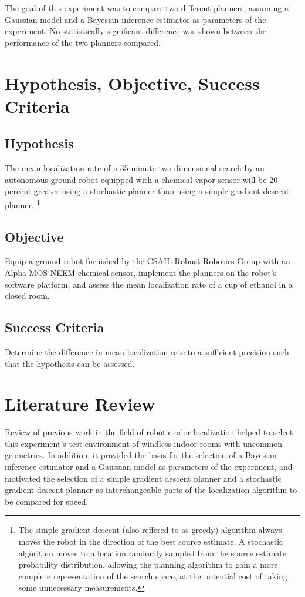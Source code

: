 \documentclass[submit, 12pt]{aiaa-pretty-modified}
\begin{document}
The goal of this experiment was to compare two different planners,
assuming a Gaussian model and a Bayesian inference estimator as
parameters of the experiment.  No statistically significant difference
was shown between the performance of the two planners compared.

\section{Hypothesis, Objective, Success Criteria}
\label{sec:hos}
\subsection*{Hypothesis} 
The mean localization rate of a 35-minute two-dimensional search by an
autonomous ground robot equipped with a chemical vapor sensor will be 20 percent
greater using a stochastic planner than using a simple gradient descent planner.
\footnote{ The simple gradient descent (also reffered to as greedy) algorithm always moves the robot in the
  direction of the best source estimate. A stochastic algorithm moves to a
  location randomly sampled from the source estimate probability distribution,
  allowing the planning algorithm to gain a more complete representation of the
  search space, at the potential cost of taking some unnecessary measurements.}

\subsection*{Objective}
Equip a ground robot furnished by the CSAIL Robust Robotics Group with an Alpha MOS NEEM chemical sensor, implement the planners on the robot's software platform, and assess the mean localization rate of a cup of ethanol in a closed room.

\subsection*{Success Criteria} 
Determine the difference in mean localization rate to a sufficient precision such that the hypothesis can be assessed.

\section{Literature Review}
\label{sec:lit-review}
Review of previous work in the field of robotic odor localization helped to select
this experiment's test environment of windless indoor rooms with uncommon
geometries. In addition, it provided the basis for the selection of a Bayesian inference
estimator and a Gaussian model as parameters of the experiment, and
motivated the selection of a simple gradient descent planner and a stochastic
gradient descent planner as interchangeable parts of the localization algorithm
to be compared for speed.
\end{document}
